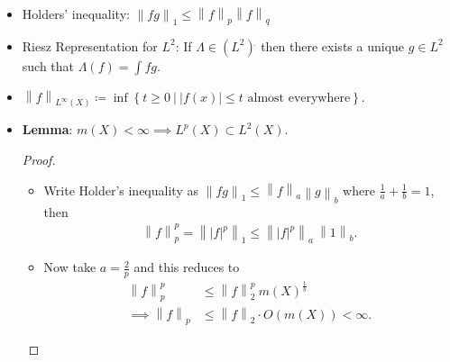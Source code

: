 \begin{solution}

\hfill

\begin{concept}

\hfill

\begin{itemize}
\item
  Holders' inequality:
  \({\left\lVert {fg} \right\rVert}_1 \leq {\left\lVert {f} \right\rVert}_p {\left\lVert {f} \right\rVert}_q\)
\item
  Riesz Representation for \(L^2\): If
  \(\Lambda \in (L^2) {}^{ \check{} }\) then there exists a unique
  \(g\in L^2\) such that \(\Lambda(f) = \int fg\).
\item
  \({\left\lVert {f} \right\rVert}_{L^\infty(X)} \coloneqq\inf \left\{{t\geq 0 {~\mathrel{\Big|}~}{\left\lvert {f(x)} \right\rvert} \leq t \text{ almost everywhere} }\right\}\).
\item
  \textbf{Lemma}: \(m(X) < \infty \implies L^p(X) \subset L^2(X)\).

  \begin{proof}

  \hfill

  \begin{itemize}
  \item
    Write Holder's inequality as
    \({\left\lVert {fg} \right\rVert}_1 \leq {\left\lVert {f} \right\rVert}_a {\left\lVert {g} \right\rVert}_b\)
    where \(\frac 1 a + \frac 1 b = 1\), then
    \begin{align*}
    {\left\lVert {f} \right\rVert}_p^p = {\left\lVert {{\left\lvert {f} \right\rvert}^p} \right\rVert}_1 \leq {\left\lVert {{\left\lvert {f} \right\rvert}^p} \right\rVert}_a ~{\left\lVert {1} \right\rVert}_b
    .\end{align*}
  \item
    Now take \(a = \frac 2 p\) and this reduces to
    \begin{align*}
    {\left\lVert {f} \right\rVert}_p^p &\leq {\left\lVert {f} \right\rVert}_2^p ~m(X)^{\frac 1 b} \\
    \implies {\left\lVert {f} \right\rVert}_p &\leq {\left\lVert {f} \right\rVert}_2 \cdot O(m(X)) < \infty
    .\end{align*}
  \end{itemize}

  \end{proof}
\end{itemize}

\end{concept}


\end{solution}
